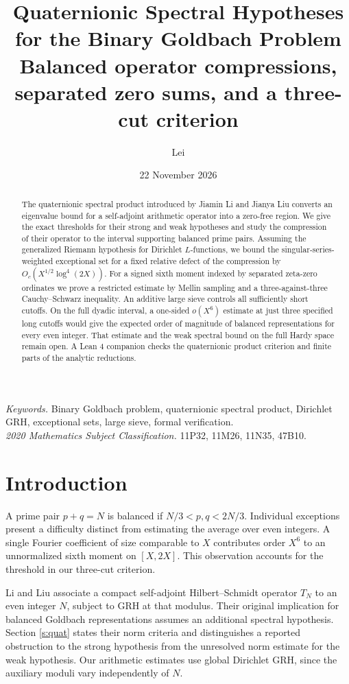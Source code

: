 \documentclass[11pt,a4paper]{article}
\title{\bfseries Quaternionic Spectral Hypotheses for the Binary Goldbach Problem\\[5pt]
\large Balanced operator compressions, separated zero sums, and a three-cut criterion}
\author{Lei}\date{22 November 2026}
\begin{document}
\maketitle
\begin{abstract}
The quaternionic spectral product introduced by Jiamin Li and Jianya Liu converts an eigenvalue bound for a self-adjoint arithmetic operator into a zero-free region. We give the exact thresholds for their strong and weak hypotheses and study the compression of their operator to the interval supporting balanced prime pairs. Assuming the generalized Riemann hypothesis for Dirichlet \(L\)-functions, we bound the singular-series-weighted exceptional set for a fixed relative defect of the compression by \(O_c(X^{1/2}\log^4(2X))\). For a signed sixth moment indexed by separated zeta-zero ordinates we prove a restricted estimate by Mellin sampling and a three-against-three Cauchy--Schwarz inequality. An additive large sieve controls all sufficiently short cutoffs. On the full dyadic interval, a one-sided \(o(X^6)\) estimate at just three specified long cutoffs would give the expected order of magnitude of balanced representations for every even integer. That estimate and the weak spectral bound on the full Hardy space remain open. A Lean 4 companion checks the quaternionic product criterion and finite parts of the analytic reductions.
\end{abstract}
\noindent\textit{Keywords.} Binary Goldbach problem, quaternionic spectral product, Dirichlet GRH, exceptional sets, large sieve, formal verification.\\
\textit{2020 Mathematics Subject Classification.} 11P32, 11M26, 11N35, 47B10.
{\small
\makeatletter\renewcommand*\l@section{\@dottedtocline{1}{0em}{1.8em}}\makeatother
\tableofcontents}
\clearpage
\section{Introduction}
A prime pair \(p+q=N\) is balanced if \(N/3<p,q<2N/3\). Individual exceptions present a difficulty distinct from estimating the average over even integers. A single Fourier coefficient of size comparable to \(X\) contributes order \(X^6\) to an unnormalized sixth moment on \([X,2X]\). This observation accounts for the threshold in our three-cut criterion.

Li and Liu \cite{LL} associate a compact self-adjoint Hilbert--Schmidt operator \(T_N\) to an even integer \(N\), subject to GRH at that modulus. Their original implication for balanced Goldbach representations assumes an additional spectral hypothesis. Section \ref{s:quat} states their norm criteria and distinguishes a reported obstruction to the strong hypothesis from the unresolved norm estimate for the weak hypothesis. Our arithmetic estimates use global Dirichlet GRH, since the auxiliary moduli vary independently of \(N\).
\end{document}
